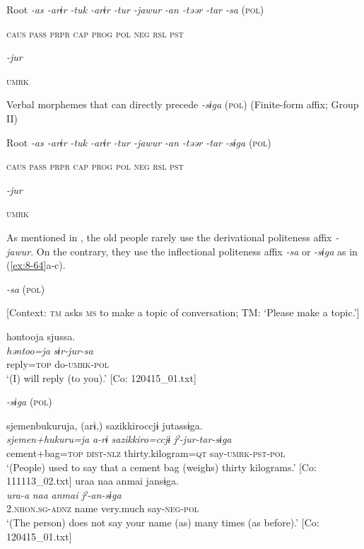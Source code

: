   Root  \textit{-as  -arɨr} %
\textit{-tuk  -arɨr  -tur  -jawur} %
\textit{-an  -təər  -tar  -sa} (\textsc{pol})

    \textsc{caus}  \textsc{pass}  \textsc{prpr}  \textsc{cap}  \textsc{prog}  \textsc{pol}  \textsc{neg}  \textsc{rsl}  \textsc{pst}

          \textit{-jur}

          \textsc{umrk}


\ex Verbal morphemes that can directly precede \textit{-sɨga} (\textsc{pol}) (Finite-form affix; Group II)

  Root  \textit{-as  -arɨr} %
\textit{-tuk  -arɨr  -tur  -jawur} %
\textit{-an  -təər  -tar  -sɨga} (\textsc{pol})

    \textsc{caus}  \textsc{pass}  \textsc{prpr}  \textsc{cap}  \textsc{prog}  \textsc{pol}  \textsc{neg}  \textsc{rsl}  \textsc{pst}

          \textit{-jur}

          \textsc{umrk}
\z
\z

As mentioned in , the old people rarely use the derivational politeness affix \textit{-jawur}. On the contrary, they use the inflectional politeness affix \textit{-sa} or \textit{-sɨga} as in (\ref{ex:8-64}a-c).

\ea\label{ex:8-64}
  \textit{-sa} (\textsc{pol})

\ea {}[Context: \textsc{tm} asks \textsc{ms} to make a topic of conversation; TM: ‘Please make a topic.’]

{\TM}
\glll  həntooja  sjussa.\\
\textit{həntoo=ja}  \textit{sɨr-jur-sa}\\
reply=\textsc{top}  do-\textsc{umrk}-\textsc{pol}\\
\glt ‘(I) will reply (to you).’ [Co: 120415\_01.txt]

  \textit{-sɨga} (\textsc{pol})

\ex
{\TM}
\glll  sjemenbukuruja,  (arɨ,)  sazikkiroccjɨ  jutassɨga.\\
\textit{sjemen+hukuru=ja}  \textit{a-rɨ}  \textit{sazikkiro=ccjɨ}  \textit{jˀ-jur-tar-sɨga}\\
cement+bag=\textsc{top}  \textsc{dist}-\textsc{nlz}  thirty.kilogram=\textsc{qt}  say-\textsc{umrk}-\textsc{pst}-\textsc{pol}\\
\glt ‘(People) used to say that a cement bag (weighs) thirty kilograms.’ [Co: 111113\_02.txt]
\ex
{\TM}
\glll  uraa  naa  anmai  jansɨga.\\
\textit{ura-a}  \textit{naa}  \textit{anmai}  \textit{jˀ-an-sɨga}\\
2.\textsc{nhon}.\textsc{sg}-\textsc{adnz}  name  very.much  say-\textsc{neg}-\textsc{pol}\\
\glt ‘(The person) does not say your name (as) many times (as before).’ [Co: 120415\_01.txt]
\z
\z

